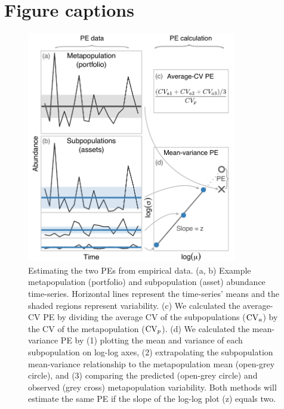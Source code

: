 \section*{Figure captions}
\begin{figure}[htbp]
  \centering
  \includegraphics[height=4in]{prophets/fig1}
  \caption{
  Estimating the two PEs from empirical data. (a, b) Example
    metapopulation (portfolio) and subpopulation (asset) abundance time-series.
    Horizontal lines represent the time-series' means and the shaded regions
    represent variability. (c) We calculated the average-CV PE by dividing the
    average CV of the subpopulations ($\mathrm{CV}_a$) by the CV of the metapopulation
    ($\mathrm{CV}_p$). (d) We calculated the mean-variance PE by (1) plotting the mean
    and variance of each subpopulation on log-log axes, (2) extrapolating the
    subpopulation mean-variance relationship to the metapopulation mean
    (open-grey circle), and (3) comparing the predicted (open-grey circle) and
    observed (grey cross) metapopulation variability. Both methods will
    estimate the same PE if the slope of the log-log plot (z) equals two.
  }
  \label{fig:didactic}
\end{figure}

